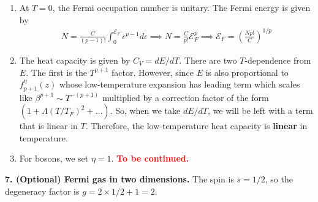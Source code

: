 \documentclass{article}
\theoremstyle{definition}
\newcommand{\be}{\beta}
\newcommand{\f}[2]{\frac{#1}{#2}}
\newcommand{\lp}{\left(}
\newcommand{\rp}{\right)}
\begin{document}
\begin{enumerate}[label=(\alph*)]
	\item At $T=0$, the Fermi occupation number is unitary. The Fermi energy is given by 
	\begin{align*}
	N = \f{C}{(p-1)!} \int_0^{\mathcal{E}_F} \epsilon^{p-1} d\epsilon \implies {N =  \f{C}{p!}\mathcal{E}_F^p} \implies  \boxed{\mathcal{E}_F = \lp \f{Np!}{C}\rp^{1/p}}
	\end{align*}
	
	\item The heat capacity is given by $C_V = dE/dT$. There are two $T$-dependence from $E$. The first is the $T^{p+1}$ factor. However, since $E$ is also proportional to $f^\eta_{p+1}(z)$ whose low-temperature expansion has leading term which scales like $\be^{p+1} \sim T^{-(p+1)}$ multiplied by a correction factor of the form $(1+ \Lambda (T/T_F)^2 + \dots )$. So, when we take $dE/dT$, we will be left with a term that is linear in $T$. Therefore, the low-temperature heat capacity is \textbf{linear} in temperature.    
	
	\item For bosons, we set $\eta = 1$. \textbf{\textcolor{red}{To be continued.}}
\end{enumerate}


\noindent \textbf{7. (Optional) Fermi gas in two dimensions.} The spin is $s=1/2$, so the degeneracy factor is $g=2\times 1/2 + 1 = 2$. 
\end{document}
